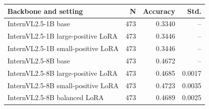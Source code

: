 \begin{tabular}{lrrr}
\toprule
Backbone and setting & N & Accuracy & Std. \\
\midrule
InternVL2.5-1B base & 473 & 0.3340 & -- \\
InternVL2.5-1B large-positive LoRA & 473 & 0.3446 & -- \\
InternVL2.5-1B small-positive LoRA & 473 & 0.3446 & -- \\
\midrule
InternVL2.5-8B base & 473 & 0.4672 & -- \\
InternVL2.5-8B large-positive LoRA & 473 & 0.4685 & 0.0017 \\
InternVL2.5-8B small-positive LoRA & 473 & 0.4723 & 0.0035 \\
InternVL2.5-8B balanced LoRA & 473 & 0.4689 & 0.0025 \\
\bottomrule
\end{tabular}
